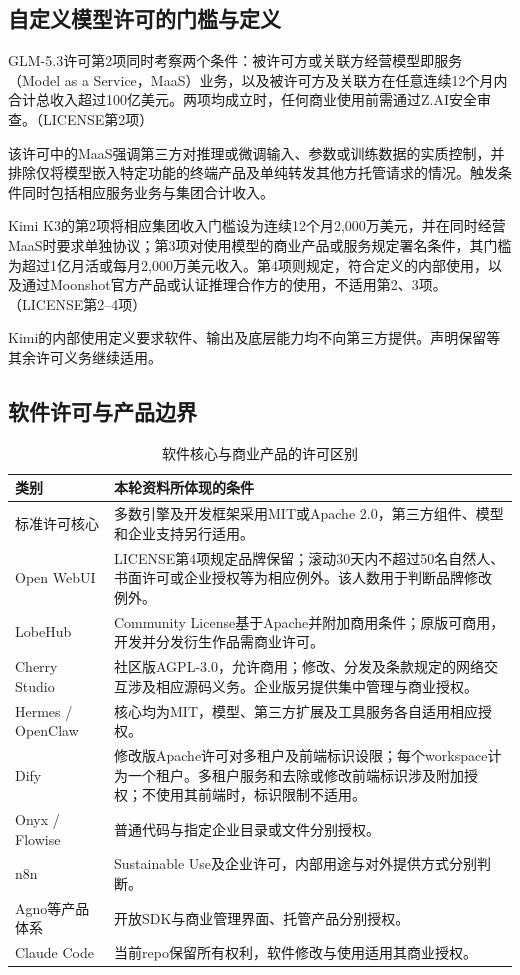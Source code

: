 \subsection{自定义模型许可的门槛与定义}\label{app:model-license}
GLM-5.3许可第2项同时考察两个条件：被许可方或关联方经营模型即服务（Model as a Service，MaaS）业务，以及被许可方及关联方在任意连续12个月内合计总收入超过100亿美元。两项均成立时，任何商业使用前需通过Z.AI安全审查。（LICENSE第2项）

该许可中的MaaS强调第三方对推理或微调输入、参数或训练数据的实质控制，并排除仅将模型嵌入特定功能的终端产品及单纯转发其他方托管请求的情况。触发条件同时包括相应服务业务与集团合计收入。

Kimi K3的第2项将相应集团收入门槛设为连续12个月2,000万美元，并在同时经营MaaS时要求单独协议；第3项对使用模型的商业产品或服务规定署名条件，其门槛为超过1亿月活或每月2,000万美元收入。第4项则规定，符合定义的内部使用，以及通过Moonshot官方产品或认证推理合作方的使用，不适用第2、3项。（LICENSE第2--4项）

Kimi的内部使用定义要求软件、输出及底层能力均不向第三方提供。声明保留等其余许可义务继续适用。

\subsection{软件许可与产品边界}\label{app:software-license}
\begin{table}[H]\small\centering
\caption{软件核心与商业产品的许可区别}
\begin{tabularx}{\linewidth}{@{}P{35mm}Y@{}}\toprule
类别 & 本轮资料所体现的条件\\\midrule
标准许可核心 & 多数引擎及开发框架采用MIT或Apache 2.0，第三方组件、模型和企业支持另行适用。\\
Open WebUI & LICENSE第4项规定品牌保留；滚动30天内不超过50名自然人、书面许可或企业授权等为相应例外。该人数用于判断品牌修改例外。\\
LobeHub & Community License基于Apache并附加商用条件；原版可商用，开发并分发衍生作品需商业许可。\\
Cherry Studio & 社区版AGPL-3.0，允许商用；修改、分发及条款规定的网络交互涉及相应源码义务。企业版另提供集中管理与商业授权。\\
Hermes / OpenClaw & 核心均为MIT，模型、第三方扩展及工具服务各自适用相应授权。\\
Dify & 修改版Apache许可对多租户及前端标识设限；每个workspace计为一个租户。多租户服务和去除或修改前端标识涉及附加授权；不使用其前端时，标识限制不适用。\\
Onyx / Flowise & 普通代码与指定企业目录或文件分别授权。\\
n8n & Sustainable Use及企业许可，内部用途与对外提供方式分别判断。\\
Agno等产品体系 & 开放SDK与商业管理界面、托管产品分别授权。\\
Claude Code & 当前repo保留所有权利，软件修改与使用适用其商业授权。\\\bottomrule
\end{tabularx}
\end{table}

